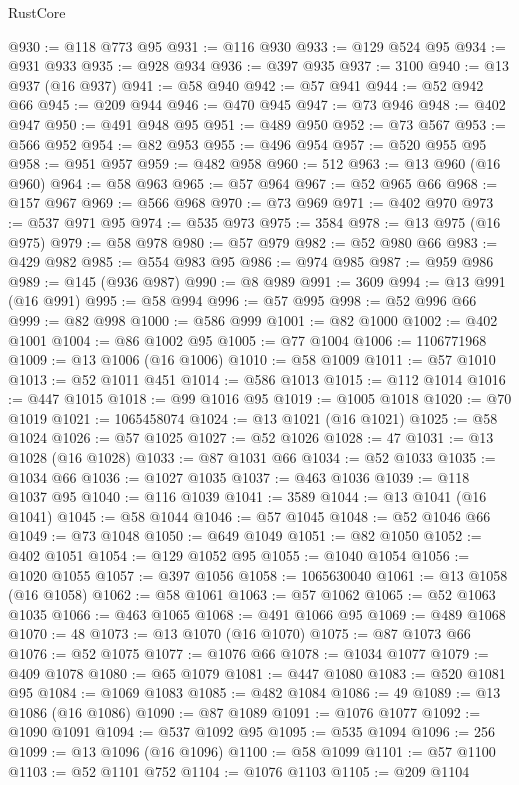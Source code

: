 \begin{lexlean}{RustCore}
\begin{coremodule}
@930 := @118 @773 @95
@931 := @116 @930
@933 := @129 @524 @95
@934 := @931 @933
@935 := @928 @934
@936 := @397 @935
@937 := 3100
@940 := @13 @937 (@16 @937)
@941 := @58 @940
@942 := @57 @941
@944 := @52 @942 @66
@945 := @209 @944
@946 := @470 @945
@947 := @73 @946
@948 := @402 @947
@950 := @491 @948 @95
@951 := @489 @950
@952 := @73 @567
@953 := @566 @952
@954 := @82 @953
@955 := @496 @954
@957 := @520 @955 @95
@958 := @951 @957
@959 := @482 @958
@960 := 512
@963 := @13 @960 (@16 @960)
@964 := @58 @963
@965 := @57 @964
@967 := @52 @965 @66
@968 := @157 @967
@969 := @566 @968
@970 := @73 @969
@971 := @402 @970
@973 := @537 @971 @95
@974 := @535 @973
@975 := 3584
@978 := @13 @975 (@16 @975)
@979 := @58 @978
@980 := @57 @979
@982 := @52 @980 @66
@983 := @429 @982
@985 := @554 @983 @95
@986 := @974 @985
@987 := @959 @986
@989 := @145 (@936 @987)
@990 := @8 @989
@991 := 3609
@994 := @13 @991 (@16 @991)
@995 := @58 @994
@996 := @57 @995
@998 := @52 @996 @66
@999 := @82 @998
@1000 := @586 @999
@1001 := @82 @1000
@1002 := @402 @1001
@1004 := @86 @1002 @95
@1005 := @77 @1004
@1006 := 1106771968
@1009 := @13 @1006 (@16 @1006)
@1010 := @58 @1009
@1011 := @57 @1010
@1013 := @52 @1011 @451
@1014 := @586 @1013
@1015 := @112 @1014
@1016 := @447 @1015
@1018 := @99 @1016 @95
@1019 := @1005 @1018
@1020 := @70 @1019
@1021 := 1065458074
@1024 := @13 @1021 (@16 @1021)
@1025 := @58 @1024
@1026 := @57 @1025
@1027 := @52 @1026
@1028 := 47
@1031 := @13 @1028 (@16 @1028)
@1033 := @87 @1031 @66
@1034 := @52 @1033
@1035 := @1034 @66
@1036 := @1027 @1035
@1037 := @463 @1036
@1039 := @118 @1037 @95
@1040 := @116 @1039
@1041 := 3589
@1044 := @13 @1041 (@16 @1041)
@1045 := @58 @1044
@1046 := @57 @1045
@1048 := @52 @1046 @66
@1049 := @73 @1048
@1050 := @649 @1049
@1051 := @82 @1050
@1052 := @402 @1051
@1054 := @129 @1052 @95
@1055 := @1040 @1054
@1056 := @1020 @1055
@1057 := @397 @1056
@1058 := 1065630040
@1061 := @13 @1058 (@16 @1058)
@1062 := @58 @1061
@1063 := @57 @1062
@1065 := @52 @1063 @1035
@1066 := @463 @1065
@1068 := @491 @1066 @95
@1069 := @489 @1068
@1070 := 48
@1073 := @13 @1070 (@16 @1070)
@1075 := @87 @1073 @66
@1076 := @52 @1075
@1077 := @1076 @66
@1078 := @1034 @1077
@1079 := @409 @1078
@1080 := @65 @1079
@1081 := @447 @1080
@1083 := @520 @1081 @95
@1084 := @1069 @1083
@1085 := @482 @1084
@1086 := 49
@1089 := @13 @1086 (@16 @1086)
@1090 := @87 @1089
@1091 := @1076 @1077
@1092 := @1090 @1091
@1094 := @537 @1092 @95
@1095 := @535 @1094
@1096 := 256
@1099 := @13 @1096 (@16 @1096)
@1100 := @58 @1099
@1101 := @57 @1100
@1103 := @52 @1101 @752
@1104 := @1076 @1103
@1105 := @209 @1104

\end{coremodule}
\end{lexlean}
